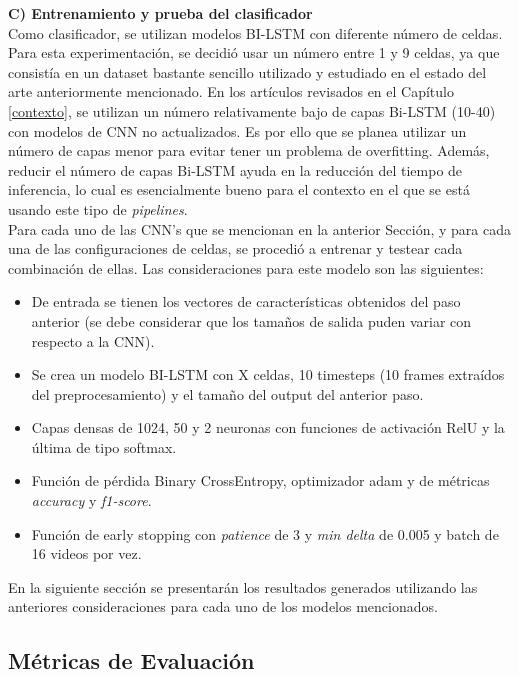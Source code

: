 \textbf{C) Entrenamiento y prueba del clasificador}\label{entrenamiento}\\

Como clasificador, se utilizan modelos BI-LSTM con diferente 
número de celdas. Para esta experimentación, se decidió usar 
un número entre 1 y 9 celdas, ya que consistía en un dataset 
bastante sencillo utilizado y estudiado en el estado del arte 
anteriormente mencionado. En los artículos revisados en el 
Capítulo \ref{contexto}, se utilizan un número 
relativamente bajo de capas Bi-LSTM (10-40) con modelos de 
CNN no actualizados. Es por ello que se planea utilizar un 
número de capas menor para evitar tener un problema de 
overfitting. Además, reducir el número de capas Bi-LSTM 
ayuda en la reducción del tiempo de inferencia, lo cual es 
esencialmente bueno para el contexto en el que se está usando 
este tipo de \textit{pipelines}.\\

Para cada uno de las CNN's que se mencionan en la anterior Sección, 
y para cada una de las configuraciones de celdas, se procedió a 
entrenar y testear cada combinación de ellas. Las consideraciones 
para este modelo son las siguientes:

\begin{itemize}
    \item De entrada se tienen los vectores de características 
    obtenidos del paso anterior (se debe considerar que los 
    tamaños de salida puden variar con respecto a la CNN). 
    \item Se crea un modelo BI-LSTM con X celdas, 10 timesteps 
    (10 frames extraídos del preprocesamiento) y el tamaño 
    del output del anterior paso.
    \item Capas densas de 1024, 50 y 2 neuronas con funciones 
    de activación RelU y la última de tipo softmax. 
    \item Función de pérdida Binary CrossEntropy, optimizador adam 
    y de métricas \textit{accuracy} y \textit{f1-score}.
    \item Función de early stopping con \textit{patience} de 3 y  
    \textit{min delta} de 0.005 y batch de 16 videos por vez.
\end{itemize}

En la siguiente sección se presentarán los resultados 
generados utilizando las anteriores consideraciones para 
cada uno de los modelos mencionados.

\subsection{Métricas de Evaluación}

